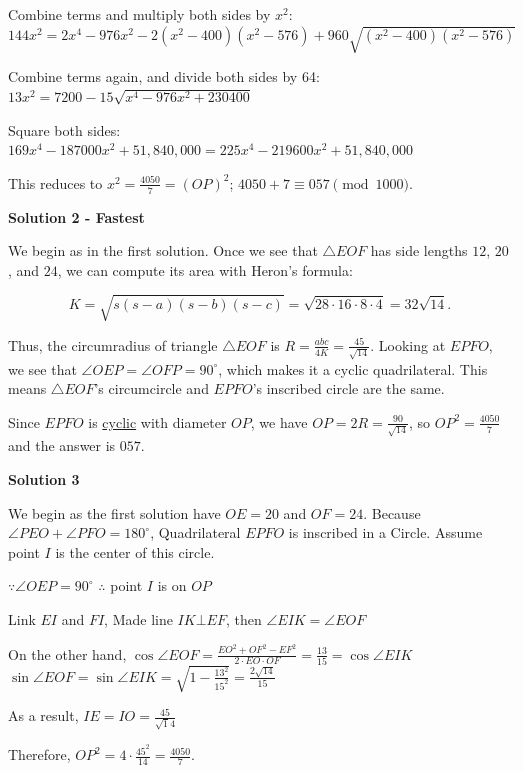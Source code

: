 \begin{enumerate}
 Combine terms and multiply both sides by $x^2$: $144 x^2 = 2 x^4 - 976 x^2 - 2 (x^2 - 400) (x^2 - 576) + 960  \sqrt{(x^2 - 400)(x^2 - 576)}$

 Combine terms again, and divide both sides by 64: $13 x^2 = 7200 - 15 \sqrt{x^4 - 976 x^2 + 230400}$

 Square both sides: $169 x^4 - 187000 x^2 + 51,840,000 = 225 x^4 - 219600 x^2 + 51,840,000$

 This reduces to $x^2 = \frac{4050}{7} = (OP)^2$; $4050 + 7 \equiv \boxed{057} \pmod{1000}$.

 



\textbf{Solution 2 - Fastest}

We begin as in the first solution.  Once we see that $\triangle EOF$ has side lengths $12$, $20$, and $24$, we can compute its area with Heron's formula:

 
 \[K = \sqrt{s(s-a)(s-b)(s-c)} = \sqrt{28\cdot 16\cdot 8\cdot 4} = 32\sqrt{14}.\]

 Thus, the circumradius of triangle $\triangle EOF$ is $R = \frac{abc}{4K} = \frac{45}{\sqrt{14}}$.  Looking at $EPFO$, we see that $\angle OEP = \angle OFP = 90^\circ$, which makes it a cyclic quadrilateral. This means $\triangle EOF$'s circumcircle and $EPFO$'s inscribed circle are the same.

 Since $EPFO$ is \href{https://artofproblemsolving.com/wiki/index.php?title=Cyclic}{cyclic} with diameter $OP$, we have $OP = 2R = \frac{90}{\sqrt{14}}$, so $OP^2 = \frac{4050}{7}$ and the answer is $\boxed{057}$.

 



\textbf{Solution 3}

We begin as the first solution have $OE=20$ and $OF=24$. Because $\angle PEO+\angle PFO=180^{\circ}$, Quadrilateral $EPFO$ is inscribed in a Circle. Assume point $I$ is the center of this circle. 

 $\because \angle OEP=90^{\circ}$
$\therefore$ point $I$ is on $OP$

 Link $EI$ and $FI$, Made line $IK\bot EF$, then $\angle EIK=\angle EOF$

 On the other hand, $\cos\angle EOF=\frac{EO^2+OF^2-EF^2}{2\cdot EO\cdot OF}=\frac{13}{15}=\cos\angle  EIK$
$\sin\angle EOF=\sin\angle EIK=\sqrt{1-\frac{13^2}{15^2}}=\frac{2\sqrt{14}}{15}$

 As a result, $IE=IO=\frac{45}{\sqrt 14}$

 Therefore, $OP^2=4\cdot \frac{45^2}{14}=\frac{4050}{7}.$


\end{enumerate}
